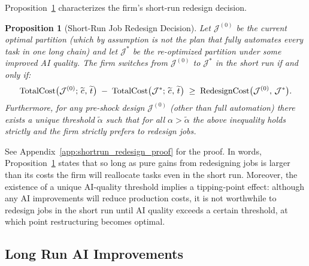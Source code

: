\documentclass{article}
\theoremstyle{plain}
\theoremstyle{plain}
\newtheorem{proposition}[theorem]{Proposition}
\begin{document}
Proposition~\ref{prop:shortrun_redesign} characterizes the firm’s short-run redesign decision.
\begin{proposition}[Short-Run Job Redesign Decision] 
\label{prop:shortrun_redesign}
Let $\mathcal{J}^{(0)}$ be the current optimal partition (which by assumption is not the plan that fully automates every task in one long chain) and let $\mathcal{J}^*$ be the re-optimized partition under some improved AI quality.
The firm switches from $\mathcal{J}^{(0)}$ to $\mathcal{J}^*$ in the short run if and only if:
\[
\mathrm{TotalCost}\bigl(\mathcal{J}^{(0)};\,\widetilde{c_{}},\,\widetilde{t_{}}\bigr)
\;-\;
\mathrm{TotalCost}\bigl(\mathcal{J}^*;\,\widetilde{c_{}},\,\widetilde{t_{}}\bigr)
\;\ge\;
\mathrm{RedesignCost}\bigl(\mathcal{J}^{(0)},\,\mathcal{J}^*\bigr).
\]
Furthermore, for any pre-shock design $\mathcal{J}^{(0)}$ (other than full automation) there exists a unique threshold $\tilde{\alpha}$ such that for all $\alpha>\tilde{\alpha}$ the above inequality holds strictly and the firm strictly prefers to redesign jobs.
\end{proposition}
See Appendix~\ref{app:shortrun_redesign_proof} for the proof.
In words, Proposition~\ref{prop:shortrun_redesign} states that so long as pure gains from redesigning jobs is larger than its costs the firm will reallocate tasks even in the short run.
Moreover, the existence of a unique AI‐quality threshold implies a tipping‐point effect: although any AI improvements will reduce production costs, it is not worthwhile to redesign jobs in the short run until AI quality exceeds a certain threshold, at which point restructuring becomes optimal. 


\subsection{Long Run AI Improvements}  
\end{document}
